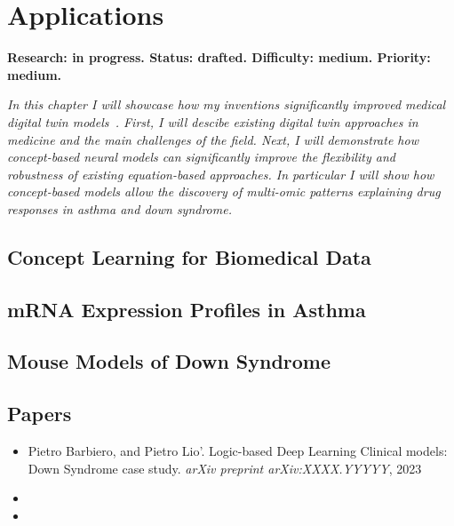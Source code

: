 \chapter{Applications} \label{chapter:applications}
\textbf{Research: in progress. Status: drafted. Difficulty: medium. Priority: medium.}

\textit{In this chapter I will showcase how my inventions significantly improved medical digital twin models~\citep{laubenbacher2021using}. First, I will descibe existing digital twin approaches in medicine and the main challenges of the field. Next, I will demonstrate how concept-based neural models can significantly improve the flexibility and robustness of existing equation-based approaches. In particular I will show how concept-based models allow the discovery of multi-omic patterns explaining drug responses in asthma and down syndrome.}

\section{Concept Learning for Biomedical Data}

\section{mRNA Expression Profiles in Asthma}

\section{Mouse Models of Down Syndrome}


\section*{Papers}
\nobibliography*
\begin{itemize}
    \item Pietro Barbiero, and Pietro Lio'. Logic-based Deep Learning Clinical models: Down Syndrome case study. \textit{arXiv preprint arXiv:XXXX.YYYYY}, 2023
    \item {}
    \item {}
\end{itemize}